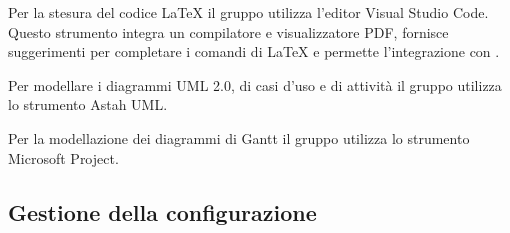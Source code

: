             Per la stesura del codice \LaTeX{} il gruppo utilizza l'editor Visual Studio Code. Questo strumento integra un compilatore e visualizzatore PDF, fornisce suggerimenti per completare i comandi di \LaTeX{} e permette l'integrazione con .

            Per modellare i diagrammi UML 2.0, di casi d'uso e di attività il gruppo utilizza lo strumento Astah UML.

            Per la modellazione dei diagrammi di Gantt il gruppo utilizza lo strumento Microsoft Project. 
          
   
    \subsection{Gestione della configurazione}
